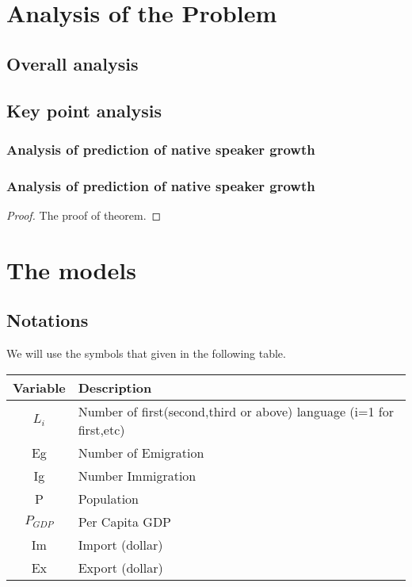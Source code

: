 \documentclass{mcmthesis}
\begin{document}
\section{Analysis of the Problem}
\subsection{Overall analysis}

\subsection{Key point analysis}
\subsubsection{Analysis of prediction of native speaker growth}

\subsubsection{Analysis of prediction of native speaker growth}


\begin{proof}
The proof of theorem.
\end{proof}
\section{The models}
\subsection{Notations}
We will use the symbols that given in the following table.
\begin{table}
\begin{center}
\begin{tabular}{c|l}
\hline
\multicolumn{1}{l}{Variable} & Description                                      \\
\hline
$L_i$                            & Number of first(second,third or above) language (i=1 for first,etc)                                       \\
Eg                           &Number of Emigration                                       \\
Ig                           &Number Immigration \\
P                            & Population                                \\
$P_{GDP}   $                         & Per Capita GDP                                   \\
Im                            & Import (dollar)                                       \\
Ex                            & Export (dollar)                                   \\
\hline
\end{tabular}
\end{center}
\end{table}
\end{document}
